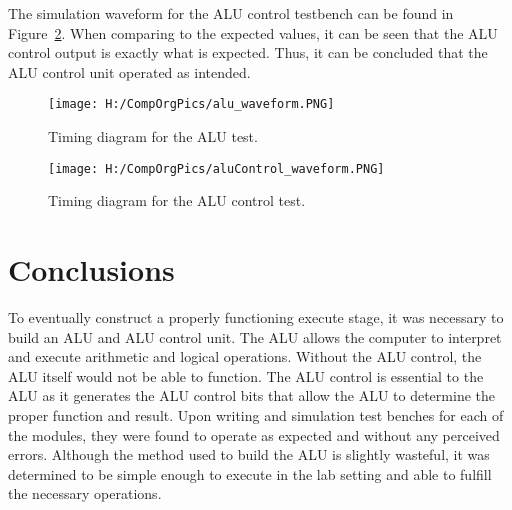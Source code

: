 \documentclass{article}
\begin{document}
The simulation waveform for the ALU control testbench can be found in Figure~\ref{fig:alucontroltest}. When comparing to the expected values, it can be seen that the ALU control output is exactly what is expected. Thus, it can be concluded that the ALU control unit operated as intended.

\begin{figure}
\begin{center}
\caption{Timing diagram for the ALU test.}\label{fig:alutest}
\texttt{[image: H:/CompOrgPics/alu\_waveform.PNG]}
\end{center}
\end{figure}

\begin{figure}
	\begin{center}
		\caption{Timing diagram for the ALU control test.}\label{fig:alucontroltest}
		\texttt{[image: H:/CompOrgPics/aluControl\_waveform.PNG]}
	\end{center}
\end{figure}


\section{Conclusions}
To eventually construct a properly functioning execute stage, it was necessary to build an ALU and ALU control unit. The ALU allows the computer to interpret and execute arithmetic and logical operations. Without the ALU control, the ALU itself would not be able to function. The ALU control is essential to the ALU as it generates the ALU control bits that allow the ALU to determine the proper function and result. Upon writing and simulation test benches for each of the modules, they were found to operate as expected and without any perceived errors. Although the method used to build the ALU is slightly wasteful, it was determined to be simple enough to execute in the lab setting and able to fulfill the necessary operations.
\end{document}
